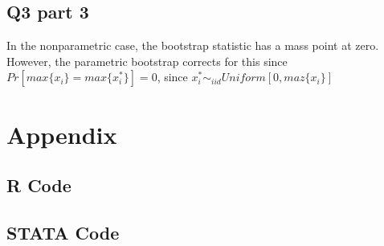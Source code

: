 \documentclass[11pt]{article}
\begin{document}
\subsection{Q3 part 3}
In the nonparametric case, the bootstrap statistic has a mass point at zero. However, the parametric bootstrap corrects for this since $Pr[max\{x_i\} = max\{x_i^*\}] = 0$, since $x_i^* \sim_{iid} Uniform[0,maz\{x_i\}]$




\section{Appendix}
\subsection{R Code}



\subsection{STATA Code}


\end{document}
